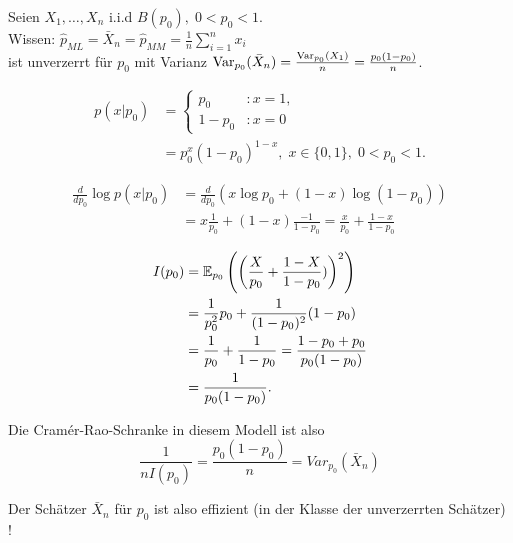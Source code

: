 \documentclass{tstextbook}
\begin{document}
\newpage

\begin{example}
	Seien $ X_1,\ldots,X_n $ i.i.d $ B(p_0), \; 0<p_0<1 $. \\
	Wissen: $ \hat{p}_{ML} = \bar{X}_n = \hat{p}_{MM} = \frac{1}{n} \sum_{i=1}^{n} x_i $  \\
	ist unverzerrt für $ p_0 $ mit Varianz $ \operatorname{Var}_{p_0}(\bar{X}_n) = \frac{\operatorname{Var}_{p_0}(X_1)}{n} = \frac{p_0(1-p_0)}{n} $. 
	
	\[
	\begin{aligned}
		p(x|p_0) & =\left\{\begin{array}{ll}
			p_0 & \colon x=1, \\
			1-p_0 & \colon x=0 \end{array}\right .\\
		& = p_0^x(1-p_0)^{1-x}, \; x\in\lbrace0,1\rbrace, \; 0<p_0<1.
	\end{aligned}
	\]
	
	\[
	\begin{aligned}
		\frac{d}{d p_0} \log p(x|p_0) & = \frac{d}{d p_0} ( x\log p_0 + (1-x)\log(1-p_0)) \\
		& = x \frac{1}{p_0} + (1-x)\frac{-1}{1-p_0} =  \frac{x}{p_0} + \frac{1-x}{1-p_0}
	\end{aligned}
	\]

	\[
	\begin{aligned}
		I(p_0) & = \mathbb E_{p_0} \left(\left(  \frac{X}{p_0} + \frac{1-X}{1-p_0} )\right)^2\right) \\
		& = \frac{1}{p_0^2}p_0 +\frac{1}{(1-p_0)^2}(1-p_0) \\
		& = \frac{1}{p_0} + \frac{1}{1-p_0}  = \frac{1-p_0+p_0}{p_0(1-p_0)} \\
		& = \frac{1}{p_0(1-p_0)}.
	\end{aligned}
	\]
	
	Die Cramér-Rao-Schranke in diesem Modell ist also 
	\[
	\frac{1}{nI(p_0)} = \frac{p_0(1-p_0)}{n} = Var_{p_0} (\bar{X}_n )
	\]
	
	Der Schätzer  $ \bar{X}_n $ für $ p_0 $ ist also effizient (in der Klasse der unverzerrten Schätzer) !
\end{example}
\end{document}
